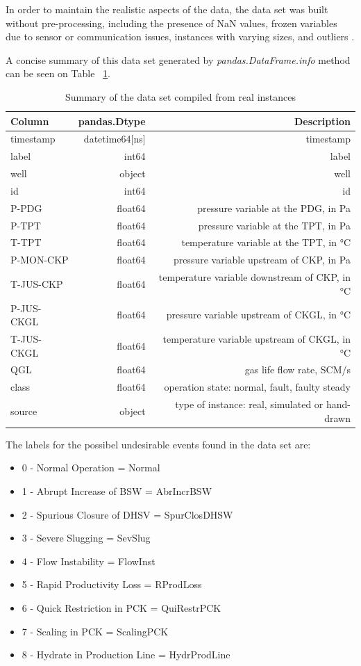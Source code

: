 \documentclass{article}
\begin{document}
In order to maintain the realistic aspects of the data, the data set was built without pre-processing, including the presence of NaN values, frozen variables due to sensor or communication issues, instances with varying sizes, and outliers \parencite{revvargas2019}.

A concise summary of this data set generated by \emph{pandas.DataFrame.info} method can be seen on Table ~\ref{tab:widgets}.

\begin{table}
\centering
\begin{tabular}{l|r|r}

Column & pandas.Dtype & Description\\\hline
timestamp & datetime64[ns] & timestamp \\
label & int64 & label \\        
well & object & well \\       
id & int64 & id \\        
P-PDG & float64 & pressure variable at the PDG, in Pa \\      
P-TPT & float64 & pressure variable at the TPT, in Pa \\     
T-TPT & float64 & temperature variable at the TPT, in °C \\      
P-MON-CKP & float64 & pressure variable upstream of CKP, in Pa \\      
T-JUS-CKP & float64 & temperature variable downstream of CKP, in °C \\      
P-JUS-CKGL & float64 & pressure variable upstream of CKGL, in °C \\       
T-JUS-CKGL & float64 & temperature variable upstream of CKGL,  in °C\\     
QGL & float64 & gas life flow rate, SCM/s\\      
class & float64 & operation state: normal, fault, faulty steady \\   
source & object & type of instance: real, simulated or hand-drawn \\     

\end{tabular}
\caption{\label{tab:widgets}Summary of the data set compiled from real instances}
\end{table}


The labels for the possibel undesirable events found in the data set are:

\begin{itemize}
\item 0 - Normal Operation = Normal
\item 1 - Abrupt Increase of BSW = AbrIncrBSW
\item 2 - Spurious Closure of DHSV = SpurClosDHSW
\item 3 - Severe Slugging = SevSlug
\item 4 - Flow Instability = FlowInst
\item 5 - Rapid Productivity Loss = RProdLoss
\item 6 - Quick Restriction in PCK = QuiRestrPCK
\item 7 - Scaling in PCK = ScalingPCK
\item 8 - Hydrate in Production Line = HydrProdLine
\end{itemize}
\end{document}
